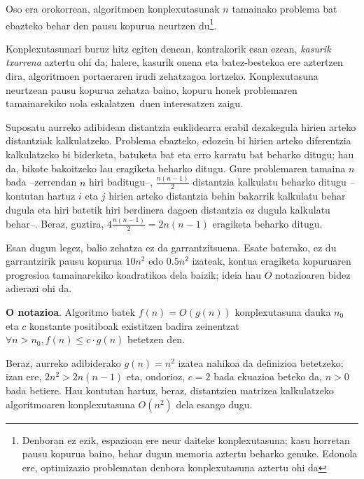 \documentclass[eu]{ifirak}\usepackage[]{graphicx}\usepackage[]{color}
\newcommand{\zkk}{\guillemotleft}
\newcommand{\skk}{\guillemotright}
\begin{document}
Oso era orokorrean, algoritmoen konplexutasunak $n$ tamainako problema bat ebazteko behar den pausu kopurua neurtzen du\footnote{Denboran ez ezik, espazioan ere neur daiteke konplexutasuna; kasu horretan pausu kopurua baino, behar dugun memoria aztertu beharko genuke. Edonola ere, optimizazio problematan denbora konplexutasuna aztertu ohi da}. 

Konplexutasunari buruz hitz egiten denean, kontrakorik esan ezean, \textit{kasurik txarrena} aztertu ohi da; halere, kasurik onena eta batez-bestekoa ere aztertzen dira, algoritmoen portaeraren irudi zehatzagoa lortzeko. Konplexutasuna neurtzean pausu kopurua zehatza baino, kopuru honek problemaren tamainarekiko nola \zkk eskalatzen\skk\ duen interesatzen zaigu.

\begin{tcolorbox}
\begin{ifexample}
Suposatu aurreko adibidean distantzia euklidearra erabil dezakegula hirien arteko distantziak kalkulatzeko. Problema ebazteko, edozein bi hirien arteko diferentzia kalkulatzeko bi biderketa, batuketa bat eta erro karratu bat beharko ditugu; hau da, bikote bakoitzeko lau eragiketa beharko ditugu. Gure problemaren tamaina $n$ bada --zerrendan $n$ hiri baditugu--, $\frac{n(n-1)}{2}$ distantzia kalkulatu beharko ditugu --kontutan hartuz $i$ eta $j$ hirien arteko distantzia behin bakarrik kalkulatu behar dugula eta hiri batetik hiri berdinera dagoen distantzia ez dugula kalkulatu behar--. Beraz, guztira, $4\frac{n(n-1)}{2} = 2n(n-1)$ eragiketa beharko ditugu.
\end{ifexample}
\end{tcolorbox}

Esan dugun legez, balio zehatza ez da garrantzitsuena. Esate baterako, ez du garrantzirik pausu kopurua $10n^2$ edo $0.5n^2$ izateak, kontua eragiketa kopuruaren progresioa tamainarekiko koadratikoa dela baizik; ideia hau $O$ notazioaren bidez adierazi ohi da.

\begin{ifdefinition}
{\bf O notazioa}. Algoritmo batek $f(n)=O(g(n))$ konplexutasuna dauka $n_0$ eta $c$ konstante positiboak existitzen badira zeinentzat $\forall n>n_0, f(n)\leq c\cdot g(n)$ betetzen den.
\end{ifdefinition}

Beraz, aurreko adibiderako $g(n)=n^2$ izatea nahikoa da definizioa betetzeko; izan ere, $2n^2>2n(n-1)$ eta, ondorioz, $c=2$ bada ekuazioa beteko da, $n>0$ bada betiere. Hau kontutan hartuz, beraz, distantzien matrizea kalkulatzeko algoritmoaren konplexutasuna $O(n^2)$ dela esango dugu. 
\end{document}
